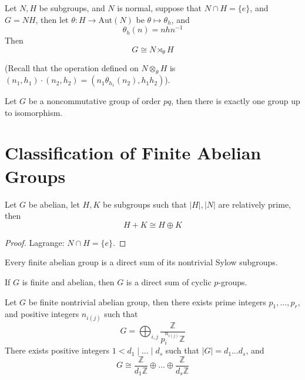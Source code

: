 \documentclass[openany]{book}
\newcommand{\Z}{\mathbb{Z}}
\newcommand{\la}{\langle}
\newcommand{\ra}{\rangle}
\begin{document}
\begin{prop}
    Let $N,H$ be subgroups, and $N$ is normal, suppose that $N\cap H=\{e\}$, and $G=NH$, then let $\theta: H\to\text{Aut}(N)$ be $\theta\mapsto\theta_h$, and 
    \begin{equation*}
        \theta_h(n)=nhn^{-1}
    \end{equation*}
    Then 
    \begin{equation*}
        G\cong N\rtimes_\theta H
    \end{equation*}
\end{prop}
(Recall that the operation defined on $N\otimes_\theta H$ is $(n_1,h_1)\cdot(n_2,h_2)=(n_1\theta_{h_1}(n_2), h_1h_2)$). 

\begin{prop}
    Let $G$ be a noncommutative group of order $pq$, then there is exactly one group up to isomorphism.
\end{prop}

\section{Classification of Finite Abelian Groups}

\begin{prop}
    Let $G$ be abelian, let $H,K$ be subgroups such that $|H|, |N|$ are relatively prime, then 
    \begin{equation*}
        H+K\cong H\oplus K
    \end{equation*}
\end{prop}
\begin{proof}
    Lagrange: $N\cap H=\{e\}$.
\end{proof}
\begin{prop}
    Every finite abelian group is a direct sum of its nontrivial Sylow subgroups.
\end{prop}


\begin{thm}

    If $G$ is finite and abelian, then $G$ is a direct sum of cyclic $p$-groups.
\end{thm}



\begin{thm}
    Let $G$ be finite nontrivial abelian group, then there exists prime integers $p_1,\dots, p_r$, and positive integers $n_{i(j)}$ such that 
    \begin{equation*}
        G=\bigoplus_{i,j}\frac{\Z}{p_i^{n_{i(j)}}\Z}
    \end{equation*}
    There exists positive integers $1<d_1\mid \dots\mid d_s$ such that $|G|=d_1\dots d_s$, and 
    \begin{equation*}
        G\cong\frac{\Z}{d_1\Z}\oplus\dots\oplus\frac{\Z}{d_s\Z}
    \end{equation*}
\end{thm}
\end{document}
